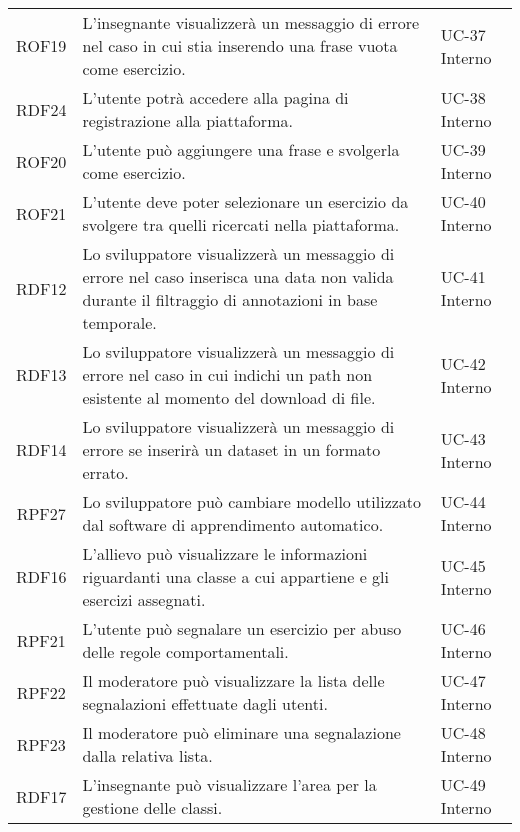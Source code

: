 \begin{tabularx}{\textwidth}{| c | p{10cm} | X |}
		ROF19 & L'insegnante visualizzerà un messaggio di errore nel caso in cui stia inserendo una frase vuota come esercizio. & UC-37 \newline Interno\\
		RDF24 & L'utente potrà accedere alla pagina di registrazione alla piattaforma. & UC-38 \newline Interno\\
		ROF20 & L'utente può aggiungere una frase e svolgerla come esercizio. & UC-39 \newline Interno\\
		ROF21 & L'utente deve poter selezionare un esercizio da svolgere tra quelli ricercati nella piattaforma. & UC-40 \newline Interno\\
		RDF12 & Lo sviluppatore visualizzerà un messaggio di errore nel caso inserisca una data non valida durante il filtraggio di annotazioni in base temporale. & UC-41 \newline Interno\\
		RDF13 & Lo sviluppatore visualizzerà un messaggio di errore nel caso in cui indichi un path non esistente al momento del download di file. & UC-42 \newline Interno\\
		RDF14 & Lo sviluppatore visualizzerà un messaggio di errore se inserirà un dataset in un formato errato. & UC-43 \newline Interno\\
		RPF27 & Lo sviluppatore può cambiare modello utilizzato dal software di apprendimento automatico. & UC-44 \newline Interno\\
		RDF16 & L'allievo può visualizzare le informazioni riguardanti una classe a cui appartiene e gli esercizi assegnati. & UC-45 \newline Interno\\
		RPF21 & L'utente può segnalare un esercizio per abuso delle regole comportamentali. & UC-46 \newline Interno\\
		RPF22 & Il moderatore può visualizzare la lista delle segnalazioni effettuate dagli utenti. & UC-47 \newline Interno\\
		RPF23 & Il moderatore può eliminare una segnalazione dalla relativa lista. & UC-48 \newline Interno\\
		RDF17 & L'insegnante può visualizzare l'area per la gestione delle classi. & UC-49 \newline Interno\\

\end{tabularx}
